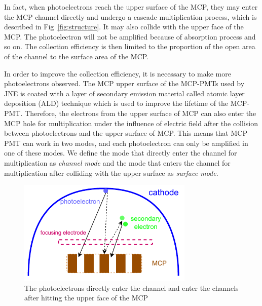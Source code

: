 \documentclass{article}
\begin{document}
In fact, when photoelectrons reach the upper surface of the MCP, 
they may enter the MCP channel directly and undergo a cascade multiplication process, 
which is described in Fig~\ref{fig:structure}. 
It may also collide with the upper face of the MCP.\@ 
The photoelectron will not be amplified because of absorption process and so on. 
The collection efficiency is then limited to the proportion of the open area of 
the channel to the surface area of the MCP.\@

In order to improve the collection efficiency, it is necessary to make more photoelectrons observed.
The MCP upper surface of the MCP-PMTs used by JNE is coated with a layer of secondary emission material 
called atomic layer deposition (ALD) technique which is used to improve the lifetime of the MCP-PMT\cite{2021Effects}. 
Therefore, the electrons from the upper surface of MCP can also enter the MCP hole for multiplication 
under the influence of electric field after the collision between photoelectrons and the upper surface of MCP.\@ 
This means that MCP-PMT can work in two modes, and each photoelectron can only be amplified in one of these modes.
 We define the mode that directly enter the channel for multiplication as \textit{channel mode} and   
the mode that enters the channel for multiplication after colliding with the upper surface as \textit{surface mode}.
\begin{figure}[ht]
    \centering
    \includegraphics[height=5cm]{pic/MCPelectron.pdf}
    \caption{The photoelectrons directly enter the channel and enter the channels after hitting the upper face of the MCP}\label{fig:MCP}
\end{figure}
\end{document}
